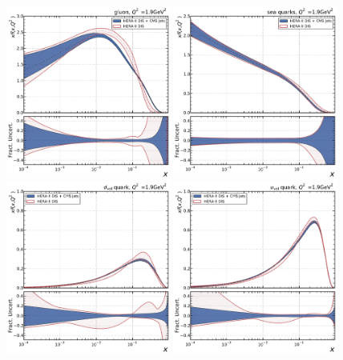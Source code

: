 \begin{figure}[tbp]
  \centering
  \includegraphics[width=0.48\textwidth]{figures/pdf_constraints/hftd/direct/HFTD_HERACMSTDJETS_V017_EIG/pdfratio/HFTD_HERACMSTDJETS_V017_EIG_0_1_9.pdf}\hfill%
  \includegraphics[width=0.48\textwidth]{figures/pdf_constraints/hftd/direct/HFTD_HERACMSTDJETS_V017_EIG/pdfratio/HFTD_HERACMSTDJETS_V017_EIG_9_1_9.pdf}
  \includegraphics[width=0.48\textwidth]{figures/pdf_constraints/hftd/direct/HFTD_HERACMSTDJETS_V017_EIG/pdfratio/HFTD_HERACMSTDJETS_V017_EIG_7_1_9.pdf}\hfill%
  \includegraphics[width=0.48\textwidth]{figures/pdf_constraints/hftd/direct/HFTD_HERACMSTDJETS_V017_EIG/pdfratio/HFTD_HERACMSTDJETS_V017_EIG_8_1_9.pdf}

\end{figure}
